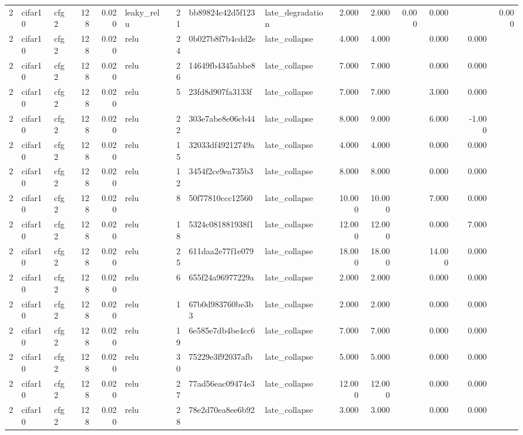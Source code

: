 \begin{table}[htbp]
{\begin{tabular}{@{}rllrrlrllrrrrrrr@{}}
2 & cifar10 & cfg2 & 128 & 0.020 & leaky\_relu & 21 & bb89824c42d5f123 & late\_degradation & 2.000 & 2.000 & 0.000 & 0.000 &  &  & 0.000 \\
2 & cifar10 & cfg2 & 128 & 0.020 & relu & 24 & 0b027b8f7b4cdd2e & late\_collapse & 4.000 & 4.000 &  & 0.000 &  & 0.000 &  \\
2 & cifar10 & cfg2 & 128 & 0.020 & relu & 26 & 14649fb4345abbe8 & late\_collapse & 7.000 & 7.000 &  & 0.000 &  & 0.000 &  \\
2 & cifar10 & cfg2 & 128 & 0.020 & relu & 5 & 23fd8d907fa3133f & late\_collapse & 7.000 & 7.000 &  & 3.000 &  & 0.000 &  \\
2 & cifar10 & cfg2 & 128 & 0.020 & relu & 22 & 303e7abe8e06cb44 & late\_collapse & 8.000 & 9.000 &  & 6.000 &  & -1.000 &  \\
2 & cifar10 & cfg2 & 128 & 0.020 & relu & 15 & 32033df49212749a & late\_collapse & 4.000 & 4.000 &  & 0.000 &  & 0.000 &  \\
2 & cifar10 & cfg2 & 128 & 0.020 & relu & 12 & 3454f2ce9ea735b3 & late\_collapse & 8.000 & 8.000 &  & 0.000 &  & 0.000 &  \\
2 & cifar10 & cfg2 & 128 & 0.020 & relu & 8 & 50f77810ccc12560 & late\_collapse & 10.000 & 10.000 &  & 7.000 &  & 0.000 &  \\
2 & cifar10 & cfg2 & 128 & 0.020 & relu & 18 & 5324c081881938f1 & late\_collapse & 12.000 & 12.000 &  & 0.000 &  & 7.000 &  \\
2 & cifar10 & cfg2 & 128 & 0.020 & relu & 25 & 611daa2e77f1e079 & late\_collapse & 18.000 & 18.000 &  & 14.000 &  & 0.000 &  \\
2 & cifar10 & cfg2 & 128 & 0.020 & relu & 6 & 655f24a96977229a & late\_collapse & 2.000 & 2.000 &  & 0.000 &  & 0.000 &  \\
2 & cifar10 & cfg2 & 128 & 0.020 & relu & 1 & 67b0d983760be3b3 & late\_collapse & 2.000 & 2.000 &  & 0.000 &  & 0.000 &  \\
2 & cifar10 & cfg2 & 128 & 0.020 & relu & 19 & 6e585e7db4be4cc6 & late\_collapse & 7.000 & 7.000 &  & 0.000 &  & 0.000 &  \\
2 & cifar10 & cfg2 & 128 & 0.020 & relu & 30 & 75229e3f92037afb & late\_collapse & 5.000 & 5.000 &  & 0.000 &  & 0.000 &  \\
2 & cifar10 & cfg2 & 128 & 0.020 & relu & 27 & 77ad56eac09474e3 & late\_collapse & 12.000 & 12.000 &  & 0.000 &  & 0.000 &  \\
2 & cifar10 & cfg2 & 128 & 0.020 & relu & 28 & 78e2d70ea8ee6b92 & late\_collapse & 3.000 & 3.000 &  & 0.000 &  & 0.000 &  \\

\end{tabular}}
\end{table}

